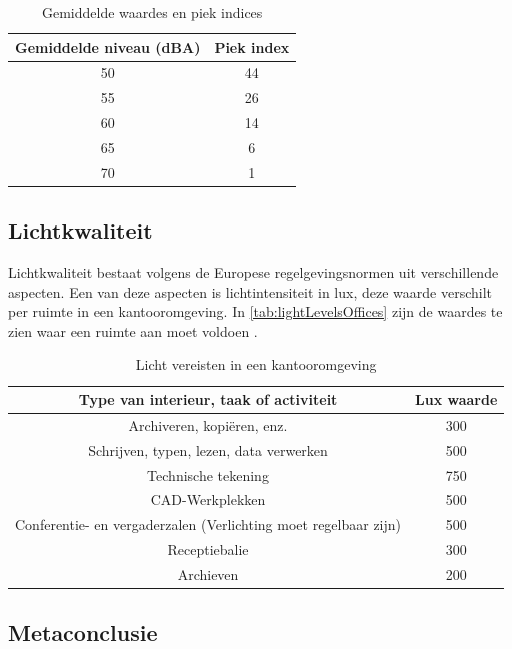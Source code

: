 \begin{table}[ht]
    \centering
    \begin{tabular}{ c | c }
        Gemiddelde niveau (dBA) & Piek index\\
        \hline
        50 & 44 \\
        55 & 26 \\
        60 & 14 \\
        65 & 6  \\
        70 & 1 
    \end{tabular}
    \caption{Gemiddelde waardes en piek indices}
    \label{tab:soundLevels}
\end{table}


\subsection{Lichtkwaliteit}

Lichtkwaliteit bestaat volgens de Europese regelgevingsnormen uit verschillende aspecten\cite{lightingIndorWorkspaces}. Een van deze aspecten is lichtintensiteit in lux, deze waarde verschilt per ruimte in een kantooromgeving. In \autoref{tab:lightLevelsOffices} zijn de waardes te zien waar een ruimte aan moet voldoen \cite{lightingIndorWorkspaces}.

\begin{table}[ht]
    \centering
    \begin{tabular}{ c | c }
        Type van interieur, taak of activiteit & Lux waarde\\
        \hline
        Archiveren, kopiëren, enz. & 300 \\
        Schrijven, typen, lezen, data verwerken & 500 \\
        Technische tekening & 750 \\
        CAD-Werkplekken & 500  \\
        Conferentie- en vergaderzalen (Verlichting moet regelbaar zijn) & 500  \\
        Receptiebalie & 300 \\
        Archieven & 200 

    \end{tabular}
    \caption{Licht vereisten in een kantooromgeving\cite{lightingIndorWorkspaces}}
    \label{tab:lightLevelsOffices}
\end{table}

\subsection{Metaconclusie}

